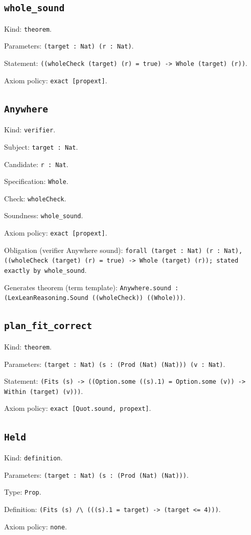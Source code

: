 \documentclass[11pt]{article}
\begin{document}
\subsection*{\texttt{whole\_sound}}
\noindent Kind: \texttt{theorem}.\par
\noindent Parameters: \texttt{(target : Nat) (r : Nat)}.\par
\noindent Statement: \texttt{((wholeCheck (target) (r) = true) -> Whole (target) (r))}.\par
\noindent Axiom policy: \texttt{exact [propext]}.\par
\subsection*{\texttt{Anywhere}}
\noindent Kind: \texttt{verifier}.\par
\noindent Subject: \texttt{target : Nat}.\par
\noindent Candidate: \texttt{r : Nat}.\par
\noindent Specification: \texttt{Whole}.\par
\noindent Check: \texttt{wholeCheck}.\par
\noindent Soundness: \texttt{whole\_sound}.\par
\noindent Axiom policy: \texttt{exact [propext]}.\par
\noindent Obligation (verifier Anywhere sound): \texttt{forall (target : Nat) (r : Nat), ((wholeCheck (target) (r) = true) -> Whole (target) (r)); stated exactly by whole\_sound}.\par
\noindent Generates theorem (term template): \texttt{Anywhere.sound : (LexLeanReasoning.Sound ((wholeCheck)) ((Whole)))}.\par
\subsection*{\texttt{plan\_fit\_correct}}
\noindent Kind: \texttt{theorem}.\par
\noindent Parameters: \texttt{(target : Nat) (s : (Prod (Nat) (Nat))) (v : Nat)}.\par
\noindent Statement: \texttt{(Fits (s) -> ((Option.some ((s).1) = Option.some (v)) -> Within (target) (v)))}.\par
\noindent Axiom policy: \texttt{exact [Quot.sound, propext]}.\par
\subsection*{\texttt{Held}}
\noindent Kind: \texttt{definition}.\par
\noindent Parameters: \texttt{(target : Nat) (s : (Prod (Nat) (Nat)))}.\par
\noindent Type: \texttt{Prop}.\par
\noindent Definition: \texttt{(Fits (s) /\textbackslash{} (((s).1 = target) -> (target <= 4)))}.\par
\noindent Axiom policy: \texttt{none}.\par
\end{document}
